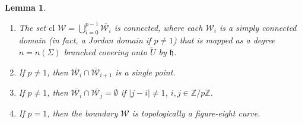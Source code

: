 \documentclass[11pt,a4paper, oneside]{amsart}
\newtheorem{lemma}[thm]{Lemma}
\theoremstyle{definition}
\theoremstyle{remark}
\numberwithin{equation}{section}
\def\Z{{\mathbb{Z}}}
\def\cW{\mathcal {W}}
\renewcommand{\tilde}{\widetilde}
\newcommand{\clo}{{\text{cl}}\,\,}
\begin{document}
\begin{lemma}\label{lifted_tiling_top_lem}
\noindent\begin{enumerate}[leftmargin=8mm]
\item The set $\displaystyle\clo{\pmb{\cW}}=\bigcup_{i=0}^{p-1} \overline{\pmb{\cW}_i}$ is connected, where each $\pmb{\cW}_i$ is a simply connected domain (in fact, a Jordan domain if $p\neq 1$) that is mapped as a degree $n=n(\Sigma)$ branched covering onto $\tilde U$ by $\mathfrak{h}$.
\item  If $p\neq 1$, then $\overline{\pmb{\cW}_i}\cap \overline{\pmb{\cW}}_{i+1}$ is a single point.
\item If $p\neq 1$, then $\overline{\pmb{\cW}_i}\cap \overline{\pmb{\cW}_j}=\emptyset$ if $\vert j-i\vert\neq1$, $i,j\in\Z/p\Z$.
\item If $p=1$, then the boundary $\pmb{\cW}$ is topologically a figure-eight curve.
\end{enumerate}
\end{lemma}
\end{document}

